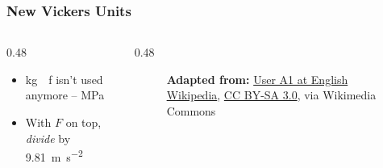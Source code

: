 \begin{frame}
	\frametitle{New Vickers Units}

    \begin{columns}
        \begin{column}{0.48\linewidth}
            \begin{itemize}[<+- | alert@+>]
                \item \unit{\kilogram{}f} isn't used anymore -- \unit{\mega\pascal}
                \item With $F$ on top, \emph{divide} by \qty{9.81}{\meter\per\square\second}
            \end{itemize}
        \end{column}
        \begin{column}{0.48\linewidth}
            \begin{figure}
                \centering
                \resizebox{0.5\linewidth}{!}{
                    
                }

                \vspace{0.5em}
                {\tiny \textbf{Adapted from:}  \href{https://commons.wikimedia.org/wiki/File:Vickers-path.svg}{User A1 at English Wikipedia}, \href{https://creativecommons.org/licenses/by-sa/3.0}{CC BY-SA 3.0}, via Wikimedia Commons\par}
            \end{figure}
        \end{column}
    \end{columns}
\end{frame}

